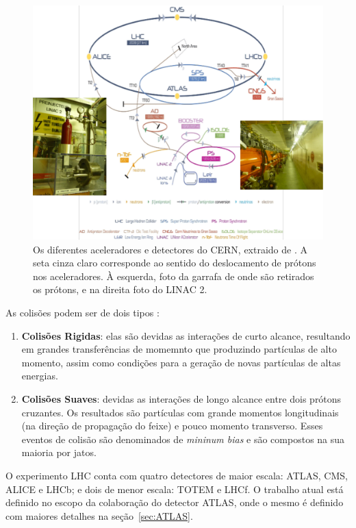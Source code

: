 \begin{figure}[h!t]
\centering
\includegraphics[width=\textwidth]{imagens/lhc_garrafa_linac2.pdf}
\caption{Os diferentes aceleradores e detectores do CERN, extraido de
\cite{cern_accelerators}. A seta cinza claro corresponde ao sentido do
deslocamento de prótons nos aceleradores. À esquerda, foto da garrafa
de onde são retirados os prótons, e na direita foto do LINAC 2.}
\label{fig:esquema_aceleradores}
\end{figure}

As colisões podem ser de dois tipos \cite{THESIS_LAR}:

\begin{enumerate}
\item \textbf{Colisões Rigidas}:
elas são devidas as interações de curto alcance,
resultando em grandes transferências de momemnto que produzindo partículas de
alto momento, assim como condições para a geração de novas partículas de altas energias.
\item \textbf{Colisões Suaves}: 
devidas as interações de longo alcance entre dois prótons cruzantes. Os
resultados são partículas com grande momentos longitudinais (na direção de
propagação do feixe) e pouco momento transverso. Esses eventos de colisão são
denominados de \emph{mininum bias} e são compostos na sua maioria por jatos.
\end{enumerate}

O experimento LHC conta com quatro detectores de maior escala: ATLAS, CMS, ALICE e
LHCb; e dois de menor escala: TOTEM e LHCf. O trabalho atual está definido no
escopo da colaboração do detector ATLAS, onde o mesmo é definido com maiores
detalhes na seção~\ref{sec:ATLAS}.

